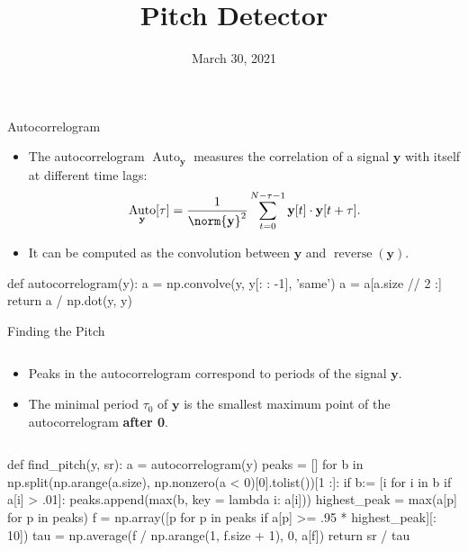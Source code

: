 \documentclass[10pt]{beamer}
\date{March 30, 2021}
\title{Pitch Detector}
\DeclareMathOperator{\Auto}{Auto}
\DeclareMathOperator{\reverse}{reverse}
\begin{document}
\def\yy{\mathbf{y}}

\frame{\titlepage}
\begin{frame}[fragile]{Autocorrelogram}
\begin{itemize}
\item The autocorrelogram $\Auto_{\yy}$ measures the correlation of a signal $\yy$ with itself at different time lags:
\[
\Auto_{\yy}[\tau]=\frac{1}{\norm{\yy}^2}\sum_{t=0}^{N-\tau-1}\yy[t]\cdot\yy[t+\tau].
\]
\item It can be computed as the convolution between $\yy$ and $\reverse(\yy)$.
\end{itemize}
\vspace{.2cm}
\begin{python}
def autocorrelogram(y):
    a = np.convolve(y, y[: : -1], 'same')
    a = a[a.size // 2 :]
    return a / np.dot(y, y)
\end{python}
\end{frame}
\begin{frame}[fragile]{Finding the Pitch}
\begin{columns}
\begin{column}{.5\textwidth}
\begin{itemize}
\item Peaks in the autocorrelogram correspond to periods of the signal $\yy$.
\item The minimal period $\tau_0$ of $\yy$ is the smallest maximum point of the autocorrelogram \textbf{after 0}.
\end{itemize}
\end{column}
\begin{column}{.5\textwidth}
\begin{center}
\resizebox{\textwidth}{!}{}
\end{center}
\end{column}
\end{columns}
\vspace{.2cm}
\begin{python}
def find_pitch(y, sr):
    a = autocorrelogram(y)
    peaks = []
    for b in np.split(np.arange(a.size),
		np.nonzero(a < 0)[0].tolist())[1 :]:
	        if b:= [i for i in b if a[i] > .01]:
	            peaks.append(max(b, key = lambda i: a[i]))
    highest_peak = max(a[p] for p in peaks)
    f = np.array([p for p in peaks
			if a[p] >= .95 * highest_peak][: 10])
    tau = np.average(f / np.arange(1, f.size + 1), 0, a[f])
    return sr / tau
\end{python}
\end{frame}
\end{document}
